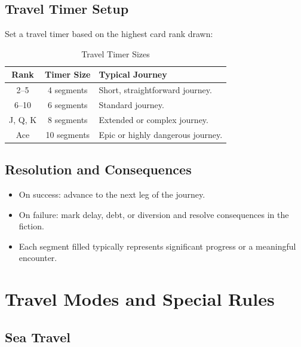 \subsection{Travel Timer Setup}\label{subsec:travel_timer}

Set a travel timer based on the highest card rank drawn:

\begin{longtable}{c c p{8cm}}
\caption{Travel Timer Sizes}\label{tab:travel_timer_sizes}\\
\toprule
\textbf{Rank} & \textbf{Timer Size} & \textbf{Typical Journey} \\
\midrule
2--5   & 4 segments & Short, straightforward journey. \\
6--10  & 6 segments & Standard journey. \\
J, Q, K & 8 segments & Extended or complex journey. \\
Ace   & 10 segments & Epic or highly dangerous journey. \\
\bottomrule
\end{longtable}

\subsection{Resolution and Consequences}\label{subsec:travel_resolution}

\begin{itemize}
    \item On success: advance to the next leg of the journey.
    \item On failure: mark delay, debt, or diversion and resolve consequences in the fiction.
    \item Each segment filled typically represents significant progress or a meaningful encounter.
\end{itemize}

\section{Travel Modes and Special Rules}\label{sec:travel_modes}

\subsection{Sea Travel}\label{subsec:sea_travel}

